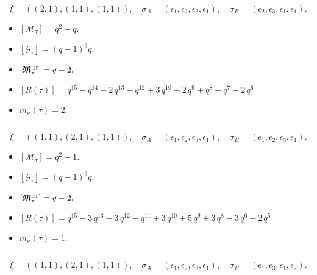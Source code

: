 \documentclass[10pt,a4paper]{amsart}
\begin{document}
$$\xi = ({(2, 1), (1, 1)}, {(1, 1)}),\quad \sigma_A = ({{\epsilon_1, \epsilon_2}, {\epsilon_3}}, {{\epsilon_1}}),\quad \sigma_B = ({{\epsilon_2, \epsilon_3}, {\epsilon_1}}, {{\epsilon_1}}).$$

\begin{itemize}
 \item $[\mathcal{M}_{\tau}] = q^{2} - q .$

 \item $[\mathcal{G}_{\tau}] = {\left(q - 1\right)}^{3} q .$

 \item $[{\frak M}_{\tau}^{\textrm{irr}}] = q - 2 .$

 \item $[R(\tau)] = q^{15} - q^{14} - 2 \, q^{13} - q^{12} + 3 \, q^{10} + 2 \, q^{9} + q^{8} - q^{7} - 2 \, q^{6} $

 \item $m_{\kappa}(\tau) = 2 .$

 \end{itemize}
\noindent\rule{8cm}{0.4pt}

$$\xi = ({(1, 1), (2, 1)}, {(1, 1)}),\quad \sigma_A = ({{\epsilon_1}, {\epsilon_2, \epsilon_3}}, {{\epsilon_1}}),\quad \sigma_B = ({{\epsilon_1}, {\epsilon_2, \epsilon_3}}, {{\epsilon_1}}).$$

\begin{itemize}
 \item $[\mathcal{M}_{\tau}] = q^{2} - 1 .$

 \item $[\mathcal{G}_{\tau}] = {\left(q - 1\right)}^{3} q .$

 \item $[{\frak M}_{\tau}^{\textrm{irr}}] = q - 2 .$

 \item $[R(\tau)] = q^{15} - 3 \, q^{13} - 3 \, q^{12} - q^{11} + 3 \, q^{10} + 5 \, q^{9} + 3 \, q^{8} - 3 \, q^{6} - 2 \, q^{5} $

 \item $m_{\kappa}(\tau) = 1 .$

 \end{itemize}
\noindent\rule{8cm}{0.4pt}

$$\xi = ({(1, 1), (2, 1)}, {(1, 1)}),\quad \sigma_A = ({{\epsilon_1}, {\epsilon_2, \epsilon_3}}, {{\epsilon_1}}),\quad \sigma_B = ({{\epsilon_1}, {\epsilon_3, \epsilon_1}}, {{\epsilon_2}}).$$
\end{document}
